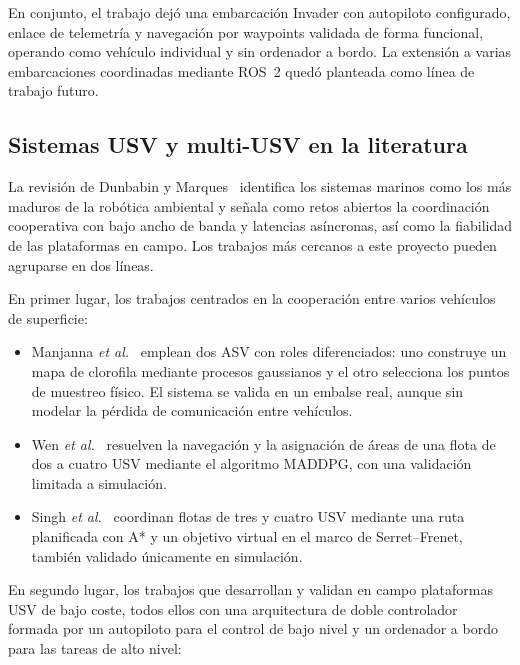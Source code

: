 En conjunto, el trabajo dejó una embarcación Invader con autopiloto configurado, enlace
de telemetría y navegación por waypoints validada de forma funcional, operando como
vehículo individual y sin ordenador a bordo. La extensión a varias embarcaciones
coordinadas mediante ROS~2 quedó planteada como línea de trabajo futuro.
 
\subsection{Sistemas USV y multi-USV en la literatura}
\label{subsec:literatura_usv}
 
La revisión de Dunbabin y Marques~\cite{dunbabin2012} identifica los sistemas marinos
como los más maduros de la robótica ambiental y señala como retos abiertos la
coordinación cooperativa con bajo ancho de banda y latencias asíncronas, así como la
fiabilidad de las plataformas en campo. Los trabajos más cercanos a este proyecto pueden
agruparse en dos líneas.
 
\newpage

En primer lugar, los trabajos centrados en la cooperación entre varios vehículos de
superficie:
 
\begin{itemize}
  \item Manjanna \textit{et al.}~\cite{manjanna2018} emplean dos ASV con roles
    diferenciados: uno construye un mapa de clorofila mediante procesos gaussianos y el
    otro selecciona los puntos de muestreo físico. El sistema se valida en un embalse
    real, aunque sin modelar la pérdida de comunicación entre vehículos.
  \item Wen \textit{et al.}~\cite{wen2022} resuelven la navegación y la asignación de
    áreas de una flota de dos a cuatro USV mediante el algoritmo MADDPG, con una
    validación limitada a simulación.
  \item Singh \textit{et al.}~\cite{singh2020} coordinan flotas de tres y cuatro USV
    mediante una ruta planificada con A* y un objetivo virtual en el marco de
    Serret--Frenet, también validado únicamente en simulación.
\end{itemize}
 
En segundo lugar, los trabajos que desarrollan y validan en campo plataformas USV de
bajo coste, todos ellos con una arquitectura de doble controlador formada por un
autopiloto para el control de bajo nivel y un ordenador a bordo para las tareas de alto
nivel:
 

